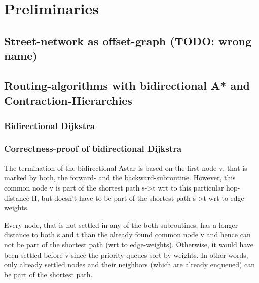\chapter{Preliminaries}
\label{chap:preliminaries}



    \section{Street-network as offset-graph (TODO: wrong name)}


    \section{Routing-algorithms with bidirectional A* and Contraction-Hierarchies}


        \subsection{Bidirectional Dijkstra}


        \subsection{Correctness-proof of bidirectional Dijkstra}

        The termination of the bidirectional Astar is based on the first node v, that is marked by both, the forward- and the backward-subroutine.
        However, this common node v is part of the shortest path s->t wrt to this particular hop-distance H, but doesn't have to be part of the shortest path s->t wrt to edge-weights.

        Every node, that is not settled in any of the both subroutines, has a longer distance to both s and t than the already found common node v and hence can not be part of the shortest path (wrt to edge-weights).
        Otherwise, it would have been settled before v since the priority-queues sort by weights.
        In other words, only already settled nodes and their neighbors (which are already enqueued) can be part of the shortest path.

